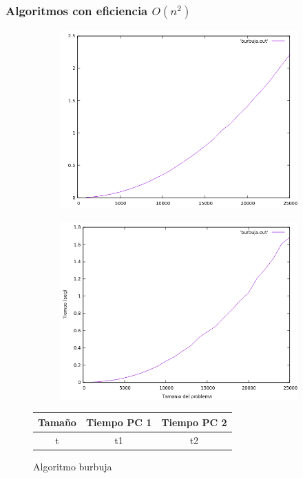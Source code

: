 \documentclass[12pt,spanish]{article}
\begin{document}
\subsubsection{Algoritmos con eficiencia $O(n^2)$}
\begin{figure}[H]
\centering
\begin{subfigure}[b]{0.45\textwidth}
\includegraphics[scale=0.45]{empirica_burbuja.png}
\caption{}
\end{subfigure}
\quad
\begin{subfigure}[b]{0.45\textwidth}
\includegraphics[scale=0.45]{empirica_burbuja_2.png}
\caption{}
\end{subfigure}
\begin{tabular}{|c|c|c|}
\hline
\textbf{Tamaño} & \textbf{Tiempo PC 1} & \textbf{Tiempo PC 2} \\
\hline
t & t1 & t2 \\
\hline
\end{tabular}
\caption{Algoritmo burbuja}
\end{figure}
\end{document}
